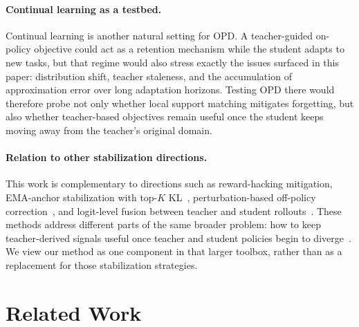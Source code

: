 \documentclass{article}
\begin{document}
\paragraph{Continual learning as a testbed.}
Continual learning is another natural setting for OPD. A teacher-guided on-policy objective could act as a retention mechanism while the student adapts to new tasks, but that regime would also stress exactly the issues surfaced in this paper: distribution shift, teacher staleness, and the accumulation of approximation error over long adaptation horizons. Testing OPD there would therefore probe not only whether local support matching mitigates forgetting, but also whether teacher-based objectives remain useful once the student keeps moving away from the teacher's original domain.

\paragraph{Relation to other stabilization directions.}
This work is complementary to directions such as reward-hacking mitigation, EMA-anchor stabilization with top-$K$ KL~\citep{emapg2026}, perturbation-based off-policy correction~\citep{alp2026}, and logit-level fusion between teacher and student rollouts~\citep{logit_fusion_2026}. These methods address different parts of the same broader problem: how to keep teacher-derived signals useful once teacher and student policies begin to diverge~\citep{li2026rethinking}. We view our method as one component in that larger toolbox, rather than as a replacement for those stabilization strategies.


\section{Related Work}
\label{app:related_work}
\end{document}
